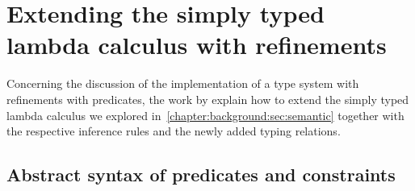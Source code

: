 \documentclass[
  oneside,
  english,
  coorientadorbanca,
  noabntexcite
]{ufsc-thesis-rn46-2019}
\begin{document}
\section{Extending the simply typed lambda calculus with refinements}

Concerning the discussion of the implementation of a type system with refinements with predicates, the work by \textcite{jhala2020tutorial} explain how to extend the simply typed lambda calculus we explored in~\cref{chapter:background:sec:semantic} together with the respective inference rules and the newly added typing relations.

\subsection{Abstract syntax of predicates and constraints}\label{ch:refinement_types:subsec:predicates_ast}
\end{document}
